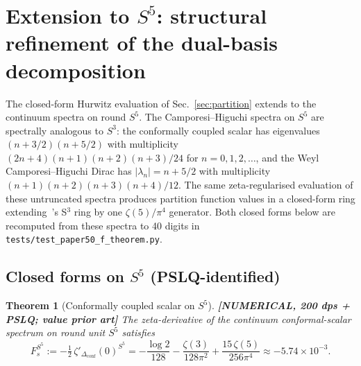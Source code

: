 \documentclass[11pt,a4paper]{article}
\theoremstyle{plain}
\newtheorem{theorem}{Theorem}[section]
\theoremstyle{definition}
\begin{document}
\section{Extension to $S^{5}$: structural refinement of the dual-basis decomposition}
\label{sec:s5_extension}

The closed-form Hurwitz evaluation of Sec.~\ref{sec:partition} extends
to the continuum spectra on round $S^{5}$. The Camporesi--Higuchi spectra on
$S^{5}$ are spectrally analogous to $S^{3}$: the conformally coupled
scalar has eigenvalues $(n + 3/2)(n + 5/2)$ with multiplicity
$(2n + 4)(n + 1)(n + 2)(n + 3)/24$ for $n = 0, 1, 2, \dots$, and the
Weyl Camporesi--Higuchi Dirac has $|\lambda_{n}| = n + 5/2$ with
multiplicity $(n + 1)(n + 2)(n + 3)(n + 4)/12$. The same
zeta-regularised evaluation of these untruncated spectra produces partition function
values in a closed-form ring extending~\cite{klebanov_pufu_safdi2011}'s
S$^{3}$ ring by one $\zeta(5)/\pi^{4}$ generator. Both closed forms
below are recomputed from these spectra to 40 digits in
\texttt{tests/test\_paper50\_f\_theorem.py}.

\subsection{Closed forms on $S^{5}$ (PSLQ-identified)}

\begin{theorem}[Conformally coupled scalar on $S^{5}$]
\label{thm:scalar_S5}
\textbf{[NUMERICAL, 200 dps + PSLQ; value prior art]}
The zeta-derivative of the continuum conformal-scalar spectrum on
round unit $S^{5}$ satisfies
\begin{equation}
F_{s}^{S^{5}} := -\tfrac{1}{2}\,\zeta'_{\Delta_\text{conf}}(0)^{S^{5}}
= -\frac{\log 2}{128} - \frac{\zeta(3)}{128\pi^{2}} + \frac{15\,\zeta(5)}{256\pi^{4}}
\approx -5.74 \times 10^{-3}.
\label{eq:Fs_S5}
\end{equation}
\end{theorem}
\end{document}
